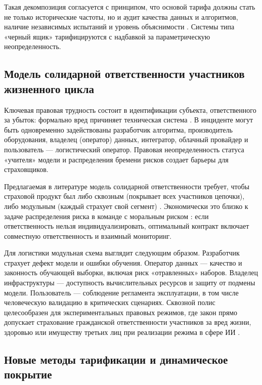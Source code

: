\documentclass[a4paper,14pt]{extarticle}
\begin{document}
Такая декомпозиция согласуется с принципом, что основой тарифа должны стать не только исторические частоты, но и аудит качества данных и алгоритмов, наличие независимых испытаний и уровень объяснимости \cite{zezina}. Системы типа «черный ящик» тарифицируются с надбавкой за параметрическую неопределенность.

\subsection{Модель солидарной ответственности участников жизненного цикла}

Ключевая правовая трудность состоит в идентификации субъекта, ответственного за убыток: формально вред причиняет техническая система \cite{zezina}. В инциденте могут быть одновременно задействованы разработчик алгоритма, производитель оборудования, владелец (оператор) данных, интегратор, облачный провайдер и пользователь --- логистический оператор. Правовая неопределенность статуса «учителя» модели и распределения бремени рисков создает барьеры для страховщиков.

Предлагаемая в литературе модель солидарной ответственности требует, чтобы страховой продукт был либо сквозным (покрывает всех участников цепочки), либо модульным (каждый страхует свой сегмент) \cite{zezina}. Экономически это близко к задаче распределения риска в команде с моральным риском \cite{pindyck}: если ответственность нельзя индивидуализировать, оптимальный контракт включает совместную ответственность и взаимный мониторинг.

Для логистики модульная схема выглядит следующим образом. Разработчик страхует дефект модели и ошибки обучения. Оператор данных --- качество и законность обучающей выборки, включая риск «отравленных» наборов. Владелец инфраструктуры --- доступность вычислительных ресурсов и защиту от подмены модели. Пользователь --- соблюдение регламента эксплуатации, в том числе человеческую валидацию в критических сценариях. Сквозной полис целесообразен для экспериментальных правовых режимов, где закон прямо допускает страхование гражданской ответственности участников за вред жизни, здоровью или имуществу третьих лиц при реализации режима в сфере ИИ \cite{fz169, zezina}.

\subsection{Новые методы тарификации и динамическое покрытие}
\end{document}
